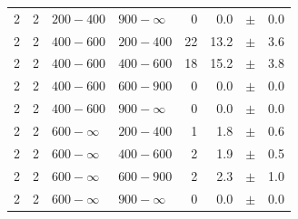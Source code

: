 \begin{table}[!h]
\begin{tabular}{rrllrrcl}
2 & 2 & $ 200- 400$ & $900-\infty$ &      0 &      0.0 &$\pm$&    0.0 \\
2 & 2 & $ 400- 600$ & $200-400$ &     22 &     13.2 &$\pm$&    3.6 \\
2 & 2 & $ 400- 600$ & $400-600$ &     18 &     15.2 &$\pm$&    3.8 \\
2 & 2 & $ 400- 600$ & $600-900$ &      0 &      0.0 &$\pm$&    0.0 \\
2 & 2 & $ 400- 600$ & $900-\infty$ &      0 &      0.0 &$\pm$&    0.0 \\
2 & 2 & $ 600- \infty$ & $200-400$ &      1 &      1.8 &$\pm$&    0.6 \\
2 & 2 & $ 600- \infty$ & $400-600$ &      2 &      1.9 &$\pm$&    0.5 \\
2 & 2 & $ 600- \infty$ & $600-900$ &      2 &      2.3 &$\pm$&    1.0 \\
2 & 2 & $ 600- \infty$ & $900-\infty$ &      0 &      0.0 &$\pm$&    0.0 \\
    \hline
  \end{tabular}
\end{table}

